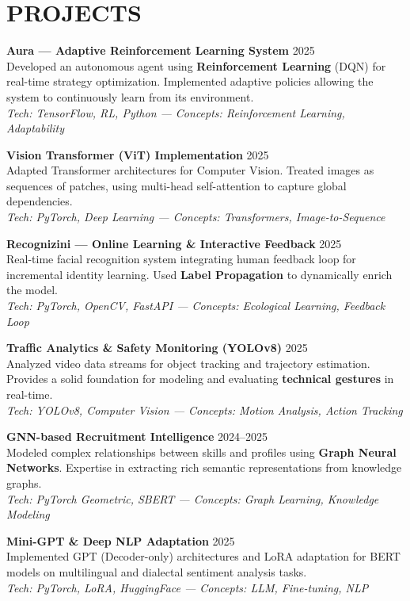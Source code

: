 \documentclass[a4paper,12pt]{article}
\begin{document}
\section{PROJECTS}
\setlength{\parskip}{6pt}
{\small

\textbf{Aura — Adaptive Reinforcement Learning System} \hfill 2025 \\
Developed an autonomous agent using \textbf{Reinforcement Learning} (DQN) for real-time strategy optimization. Implemented adaptive policies allowing the system to continuously learn from its environment. \\
\textit{Tech: TensorFlow, RL, Python — Concepts: Reinforcement Learning, Adaptability}

\textbf{Vision Transformer (ViT) Implementation} \hfill 2025 \\
Adapted Transformer architectures for Computer Vision. Treated images as sequences of patches, using multi-head self-attention to capture global dependencies. \\
\textit{Tech: PyTorch, Deep Learning — Concepts: Transformers, Image-to-Sequence}

\textbf{Recognizini — Online Learning \& Interactive Feedback} \hfill 2025 \\
Real-time facial recognition system integrating human feedback loop for incremental identity learning. Used \textbf{Label Propagation} to dynamically enrich the model. \\
\textit{Tech: PyTorch, OpenCV, FastAPI — Concepts: Ecological Learning, Feedback Loop}

\textbf{Traffic Analytics \& Safety Monitoring (YOLOv8)} \hfill 2025 \\
Analyzed video data streams for object tracking and trajectory estimation. Provides a solid foundation for modeling and evaluating \textbf{technical gestures} in real-time. \\
\textit{Tech: YOLOv8, Computer Vision — Concepts: Motion Analysis, Action Tracking}

\textbf{GNN-based Recruitment Intelligence} \hfill 2024--2025 \\
Modeled complex relationships between skills and profiles using \textbf{Graph Neural Networks}. Expertise in extracting rich semantic representations from knowledge graphs. \\
\textit{Tech: PyTorch Geometric, SBERT — Concepts: Graph Learning, Knowledge Modeling}

\textbf{Mini-GPT \& Deep NLP Adaptation} \hfill 2025 \\
Implemented GPT (Decoder-only) architectures and LoRA adaptation for BERT models on multilingual and dialectal sentiment analysis tasks. \\
\textit{Tech: PyTorch, LoRA, HuggingFace — Concepts: LLM, Fine-tuning, NLP}

}
\end{document}
